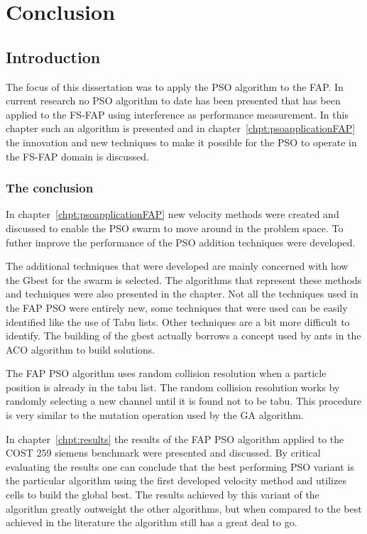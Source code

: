 \chapter{Conclusion}
\label{chpt:conclusion}
\section{Introduction}
The focus of this dissertation was to apply the PSO algorithm to the FAP. In current research no PSO algorithm to date has been presented that has been applied to the FS-FAP using interference as performance measurement. In this chapter such an algorithm is presented and in chapter~\ref{chpt:psoapplicationFAP} the innovation and new techniques to make it possible for the PSO to operate in the FS-FAP domain is discussed.

\subsection{The conclusion}
In chapter~\ref{chpt:psoapplicationFAP} new velocity methods were created and discussed to enable the PSO swarm to move around in the problem space. To futher improve the performance of the PSO addition techniques were developed.

The additional techniques that were developed are mainly concerned with how the Gbest for the swarm is selected. The algorithms that represent these methods and techniques were also presented in the chapter. Not all the techniques used in the FAP PSO were entirely new, some techniques that were used can be easily identified like the use of Tabu lists. Other techniques are a bit more difficult to identify. The building of the gbest actually borrows a concept used by ants in the ACO algorithm to build solutions. 

The FAP PSO algorithm uses random collision resolution when a particle position is already in the tabu list. The random collision resolution works by randomly selecting a new channel until it is found not to be tabu. This procedure is very similar to the mutation operation used by the GA algorithm.

In chapter~\ref{chpt:results} the results of the FAP PSO algorithm applied to the COST 259 siemens benchmark were presented and discussed. By critical evaluating the results one can conclude that the best performing PSO variant is the particular algorithm using the first developed velocity method and utilizes cells to build the global best. The results achieved by this variant of the algorithm greatly outweight the other algorithms, but when compared to the best achieved in the literature the algorithm still has a great deal to go.

